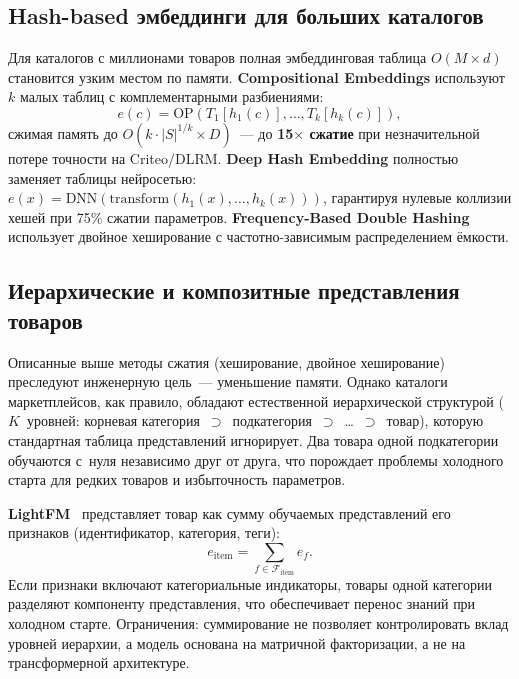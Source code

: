 \subsection{Hash-based эмбеддинги для больших каталогов}
\label{subsec:ch1:hash}

Для каталогов с миллионами товаров полная эмбеддинговая таблица $O(M \times d)$ становится узким местом по памяти. \textbf{Compositional Embeddings} \cite{shi2020compositional} используют $k$ малых таблиц с комплементарными разбиениями:
\begin{equation}
    e(c) = \text{OP}(T_1[h_1(c)], \ldots, T_k[h_k(c)]),
\end{equation}
сжимая память до $O(k \cdot |S|^{1/k} \times D)$~--- до \textbf{15$\times$ сжатие} при незначительной потере точности на Criteo/DLRM. 
\textbf{Deep Hash Embedding} \cite{kang2020deepHash} полностью заменяет таблицы нейросетью: $e(x) = \text{DNN}(\text{transform}(h_1(x), \ldots, h_k(x)))$, гарантируя нулевые коллизии хешей при 75\% сжатии параметров. 
\textbf{Frequency-Based Double Hashing} \cite{zhang2020doublehash} использует двойное хеширование с частотно-зависимым распределением ёмкости.

\subsection{Иерархические и композитные представления товаров}
\label{subsec:ch1:hier_emb}

Описанные выше методы сжатия (хеширование, двойное хеширование) преследуют инженерную цель~--- уменьшение памяти. Однако каталоги маркетплейсов, как правило, обладают естественной иерархической структурой ($K$~уровней: корневая категория~$\supset$~подкатегория~$\supset$~\ldots~$\supset$~товар), которую стандартная таблица представлений игнорирует. Два товара одной подкатегории обучаются с~нуля независимо друг от друга, что порождает проблемы холодного старта для редких товаров и избыточность параметров.

\textbf{LightFM}~\cite{kula2015lightfm} представляет товар как сумму обучаемых представлений его признаков (идентификатор, категория, теги):
\begin{equation}
    e_{\mathrm{item}} = \sum_{f \in \mathcal{F}_{\mathrm{item}}} e_f.
\end{equation}
Если признаки включают категориальные индикаторы, товары одной категории разделяют компоненту представления, что обеспечивает перенос знаний при холодном старте. Ограничения: суммирование не позволяет контролировать вклад уровней иерархии, а модель основана на матричной факторизации, а не на трансформерной архитектуре.

